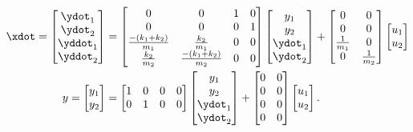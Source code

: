 \documentclass[10pt]{article}
\begin{document}
\begin{equation}
\begin{split}
  \xdot =
  \begin{bmatrix}
    \ydot_1 \\ \ydot_2 \\ \yddot_1 \\ \yddot_2
  \end{bmatrix}
  &=
  \begin{bmatrix}
    0 & 0 & 1 & 0\\ 0 & 0 & 0 & 1 \\
    \frac{-(k_1 + k_2)}{m_1} & \frac{k_2}{m_1} & 0 & 0\\
    \frac{k_2}{m_2} &  \frac{-(k_1 + k_2)}{m_2} & 0 & 0
  \end{bmatrix}
  \begin{bmatrix}
    y_1 \\ y_2 \\ \ydot_1 \\ \ydot_2
  \end{bmatrix}
  +
  \begin{bmatrix}
    0 & 0 \\ 0 & 0 \\ \frac{1}{m_1} & 0 \\ 0 & \frac{1}{m_2}
  \end{bmatrix}
  \begin{bmatrix}
    u_1 \\ u_2
  \end{bmatrix}\\
y =
\begin{bmatrix}
  y_1 \\ y_2
\end{bmatrix}
& = 
\begin{bmatrix}
  1& 0 & 0 & 0 \\ 0 & 1 & 0 & 0
\end{bmatrix}
  \begin{bmatrix}
    y_1 \\ y_2 \\ \ydot_1 \\ \ydot_2
  \end{bmatrix}
+ \begin{bmatrix}
    0 & 0 \\ 0 & 0 \\0 & 0 \\ 0 & 0
  \end{bmatrix}
  \begin{bmatrix}
    u_1 \\ u_2
  \end{bmatrix}.
\end{split}
\end{equation}
\end{document}
